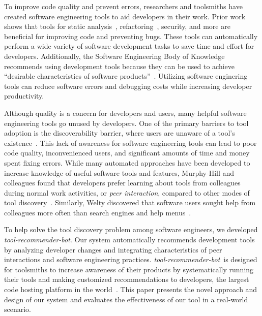 \documentclass[sigconf,review,anonymous]{acmart}
\newcommand{\tool}{\textsl{tool-recommender-bot}}
\begin{document}
To improve code quality and prevent errors, researchers and toolsmiths have created software engineering tools to aid developers in their work. Prior work shows that tools for static analysis~\cite{UsingStaticAnalysis}, refactoring~\cite{Murphy-HillFitness}, security, and more are beneficial for improving code and preventing bugs. These tools can automatically perform a wide variety of software development tasks to save time and effort for developers. Additionally, the Software Engineering Body of Knowledge recommends using development tools because they can be used to achieve ``desirable characteristics of software products''~\cite{SWEBOK}. Utilizing software enginering tools can reduce software errors and debugging costs while increasing developer productivity.

Although quality is a concern for developers and users, many helpful software engineering tools go unused by developers. One of the primary barriers to tool adoption is the discoverability barrier, where users are unaware of a tool's existence~\cite{Murphy-HillScreencastingDiscovery}. This lack of awareness for software engineering tools can lead to poor code quality, inconvenienced users, and significant amounts of time and money spent fixing errors. While many automated approaches have been developed to increase knowledge of useful software tools and features, Murphy-Hill and colleagues found that developers prefer learning about tools from colleagues during normal work activities, or \textit{peer interaction}, compared to other modes of tool discovery~\cite{MurphyHill2011PeerInteraction}. Similarly, Welty discovered that software users sought help from colleagues more often than search engines and help menus~\cite{Welty2011Help}.

To help solve the tool discovery problem among software engineers, we developed \tool. Our system automatically recommends development tools by analyzing developer changes and integrating characteristics of peer interactions and software engineering practices. \tool~is designed for toolsmiths to increase awareness of their products by systematically running their tools and making customized recommendations to developers, the largest code hosting platform in the world~\cite{GousiosGitHub}. This paper presents the novel approach and design of our system and evaluates the effectiveness of our tool in a real-world scenario.

\end{document}

